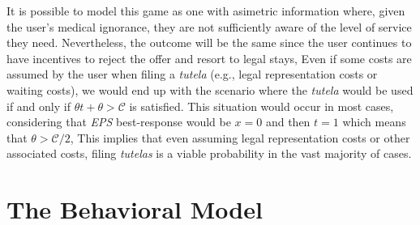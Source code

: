 \documentclass[12pt]{article}
\begin{document}
\begin{flushleft}
    It is possible to model this game as one with asimetric information where, given the user's medical ignorance, they are not sufficiently aware of the level of service they need. Nevertheless, the outcome will be the same since the user continues to have incentives to reject the offer and resort to legal stays, Even if some costs are assumed by the user when filing a \textit{tutela} (e.g., legal representation costs or waiting costs), we would end up with the scenario where the \textit{tutela} would be used if and only if $\theta t + \theta > \mathcal{C}$ is satisfied. This situation would occur in most cases, considering that \textit{EPS} best-response would be $x=0$ and then $t=1$ which means that $\theta > \mathcal{C}/2$, This implies that even assuming legal representation costs or other associated costs, filing \textit{tutelas} is a viable probability in the vast majority of cases. 
    
\end{flushleft}

\section{The Behavioral Model}
\end{document}
